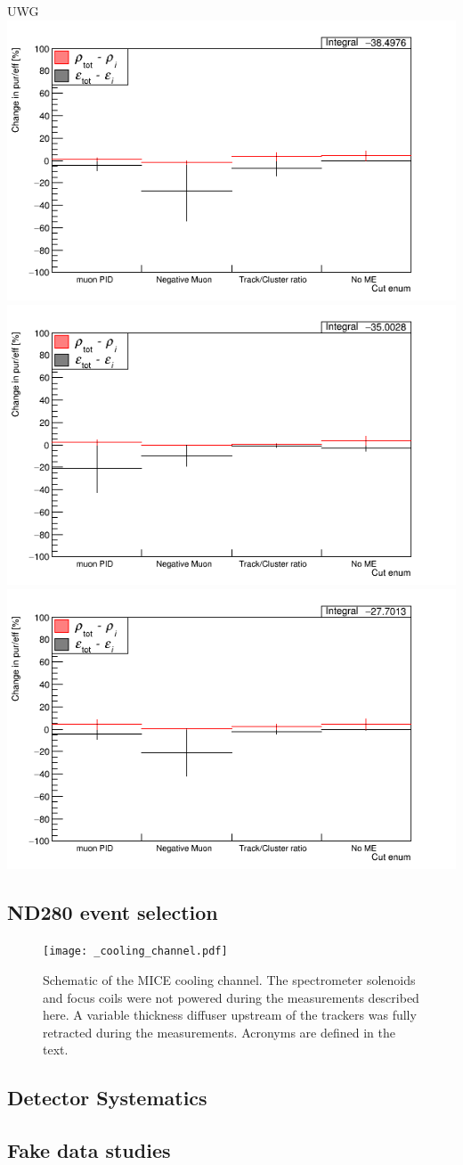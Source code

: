 \documentclass[%
 reprint,
 amsmath,amssymb,
 aps,
]{revtex4-2}
\begin{document}
\begin{frame}{UWG}
 \includegraphics[width=.45\textwidth]{images/nMinusOneCuts_sample2.png}
    \includegraphics[width=.45\textwidth]{images/nMinusOneCuts_sample1.png}
    \includegraphics[width=.45\textwidth]{images/nMinusOneCuts_sample0.png}
\subsection{ND280 event selection}
\begin{figure}[htbp]
\begin{center}
\texttt{[image: \_cooling\_channel.pdf]}
\end{center}
\caption{Schematic of the MICE cooling channel. The spectrometer solenoids and focus coils were not powered during the measurements described here. A variable thickness diffuser upstream of the trackers was fully retracted during the measurements. Acronyms are defined in the text.}
\label{fig:micecc}
\end{figure}

\subsection{Detector Systematics}
\label{sec:selection}

\subsection{Fake data studies}


\end{frame}
\end{document}
